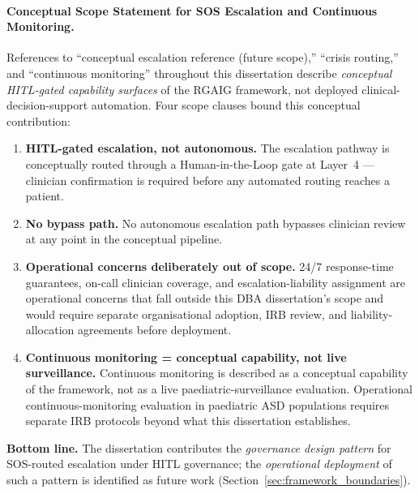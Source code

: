 \paragraph{Conceptual Scope Statement for SOS Escalation and Continuous Monitoring.}
\label{para:sos_scope_statement}

\noindent References to ``conceptual escalation reference (future scope),'' ``crisis routing,'' and ``continuous monitoring'' throughout this dissertation describe \textit{conceptual HITL-gated capability surfaces} of the RGAIG framework, not deployed clinical-decision-support automation. Four scope clauses bound this conceptual contribution:

\begin{enumerate}[leftmargin=*, itemsep=2pt, label=(\roman*)]
\item \textbf{HITL-gated escalation, not autonomous.} The escalation pathway is conceptually routed through a Human-in-the-Loop gate at Layer~4 — clinician confirmation is required before any automated routing reaches a patient.
\item \textbf{No bypass path.} No autonomous escalation path bypasses clinician review at any point in the conceptual pipeline.
\item \textbf{Operational concerns deliberately out of scope.} 24/7 response-time guarantees, on-call clinician coverage, and escalation-liability assignment are operational concerns that fall outside this DBA dissertation's scope and would require separate organisational adoption, IRB review, and liability-allocation agreements before deployment.
\item \textbf{Continuous monitoring = conceptual capability, not live surveillance.} Continuous monitoring is described as a conceptual capability of the framework, not as a live paediatric-surveillance evaluation. Operational continuous-monitoring evaluation in paediatric ASD populations requires separate IRB protocols beyond what this dissertation establishes.
\end{enumerate}

\noindent\textbf{Bottom line.} The dissertation contributes the \emph{governance design pattern} for SOS-routed escalation under HITL governance; the \emph{operational deployment} of such a pattern is identified as future work (Section~\ref{sec:framework_boundaries}).

